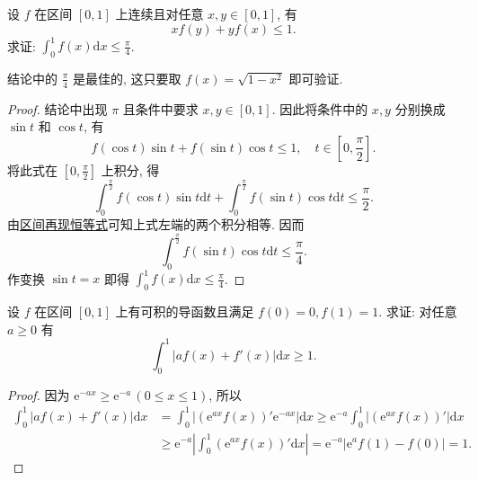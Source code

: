 \documentclass[../../main.tex]{subfiles}%
\begin{document}
\begin{example}
设 $f$ 在区间 $[0,1]$ 上连续且对任意 $x,y\in[0,1]$, 有
$$xf(y)+yf(x)\leqslant 1.$$
求证: $\int_0^1 f(x)\mathrm{d}x\leqslant \frac{\pi}{4}$.
\end{example}
\begin{remark}
结论中的 $\frac{\pi}{4}$ 是最佳的, 这只要取 $f(x)=\sqrt{1-x^2}$ 即可验证.
\end{remark}
\begin{proof}
结论中出现 $\pi$ 且条件中要求 $x,y\in[0,1]$. 因此将条件中的 $x,y$ 分别换成 $\sin t$ 和 $\cos t$, 有
$$f(\cos t)\sin t+f(\sin t)\cos t\leqslant 1,\quad t\in\left[0,\frac{\pi}{2}\right].$$
将此式在 $\left[0,\frac{\pi}{2}\right]$ 上积分, 得
$$\int_0^{\frac{\pi}{2}}f(\cos t)\sin t\mathrm{d}t+\int_0^{\frac{\pi}{2}}f(\sin t)\cos t\mathrm{d}t\leqslant \frac{\pi}{2}.$$
由\hyperref[theorem:区间再现恒等式]{区间再现恒等式}可知上式左端的两个积分相等. 因而
$$\int_0^{\frac{\pi}{2}}f(\sin t)\cos t\mathrm{d}t\leqslant \frac{\pi}{4}.$$
作变换 $\sin t=x$ 即得 $\int_0^1 f(x)\mathrm{d}x\leqslant \frac{\pi}{4}$.
\end{proof}

\begin{example}
设 $f$ 在区间 $[0,1]$ 上有可积的导函数且满足 $f(0)=0,f(1)=1$. 求证: 对任意 $a\geqslant 0$ 有
$$\int_0^1|af(x)+f'(x)|\mathrm{d}x\geqslant 1.$$
\end{example}
\begin{proof}
因为 $\mathrm{e}^{-ax}\geqslant \mathrm{e}^{-a}\,(0\leqslant  x\leqslant 1)$, 所以
$$
\begin{aligned}
\int_0^1|af(x)+f'(x)|\mathrm{d}x &= \int_0^1|(\mathrm{e}^{ax}f(x))'\mathrm{e}^{-ax}|\mathrm{d}x \geqslant  \mathrm{e}^{-a}\int_0^1|(\mathrm{e}^{ax}f(x))'|\mathrm{d}x \\
&\geqslant  \mathrm{e}^{-a}\left|\int_0^1(\mathrm{e}^{ax}f(x))'\mathrm{d}x\right| = \mathrm{e}^{-a}|\mathrm{e}^{a}f(1)-f(0)| = 1.
\end{aligned}
$$
\end{proof}
\end{document}
